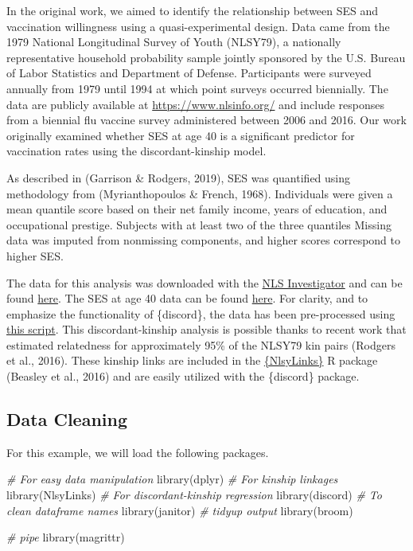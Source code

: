 \documentclass[10pt,a4paper,onecolumn]{article}
\newenvironment{Shaded}{\begin{snugshade}}{\end{snugshade}}
\newcommand{\CommentTok}[1]{\textcolor[rgb]{0.56,0.35,0.01}{\textit{#1}}}
\newcommand{\FunctionTok}[1]{\textcolor[rgb]{0.00,0.00,0.00}{#1}}
\newcommand{\NormalTok}[1]{#1}
\begin{document}
In the original work, we aimed to identify the relationship between SES
and vaccination willingness using a quasi-experimental design. Data came
from the 1979 National Longitudinal Survey of Youth (NLSY79), a
nationally representative household probability sample jointly sponsored
by the U.S. Bureau of Labor Statistics and Department of Defense.
Participants were surveyed annually from 1979 until 1994 at which point
surveys occurred biennially. The data are publicly available at
\url{https://www.nlsinfo.org/} and include responses from a biennial flu
vaccine survey administered between 2006 and 2016. Our work originally
examined whether SES at age 40 is a significant predictor for
vaccination rates using the discordant-kinship model.

As described in (Garrison \& Rodgers, 2019), SES was quantified using
methodology from (Myrianthopoulos \& French, 1968). Individuals were
given a mean quantile score based on their net family income, years of
education, and occupational prestige. Subjects with at least two of the
three quantiles Missing data was imputed from nonmissing components, and
higher scores correspond to higher SES.

The data for this analysis was downloaded with the
\href{https://www.nlsinfo.org/investigator/pages/login}{NLS
Investigator} and can be found
\href{https://github.com/jdtrat/senior-thesis-discord/blob/main/data/flu_shot.dat}{here}.
The SES at age 40 data can be found
\href{https://github.com/jdtrat/senior-thesis-discord/blob/main/data/nlsy-ses.csv}{here}.
For clarity, and to emphasize the functionality of \{discord\}, the data
has been pre-processed using
\href{https://github.com/jdtrat/senior-thesis-discord/blob/main/R/preprocess-discord-flu.R}{this
script}. This discordant-kinship analysis is possible thanks to recent
work that estimated relatedness for approximately 95\% of the NLSY79 kin
pairs (Rodgers et al., 2016). These kinship links are included in the
\href{http://nlsy-links.github.io/NlsyLinks/index.html}{\{NlsyLinks\}} R
package (Beasley et al., 2016) and are easily utilized with the
\{discord\} package.

\hypertarget{data-cleaning}{%
\subsection{Data Cleaning}\label{data-cleaning}}

For this example, we will load the following packages.

\begin{Shaded}
\begin{Highlighting}[]
\CommentTok{\# For easy data manipulation}
\FunctionTok{library}\NormalTok{(dplyr)}
\CommentTok{\# For kinship linkages}
\FunctionTok{library}\NormalTok{(NlsyLinks)}
\CommentTok{\# For discordant{-}kinship regression}
\FunctionTok{library}\NormalTok{(discord)}
\CommentTok{\# To clean dataframe names}
\FunctionTok{library}\NormalTok{(janitor)}
\CommentTok{\# tidyup output}
\FunctionTok{library}\NormalTok{(broom)}

\CommentTok{\# pipe}
\FunctionTok{library}\NormalTok{(magrittr)}
\end{Highlighting}
\end{Shaded}
\end{document}
